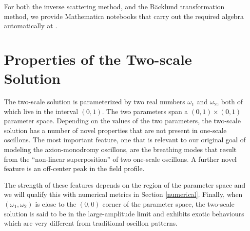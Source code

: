 \documentclass[11pt]{book}
\begin{document}
\medbreak
For both the inverse scattering method, and the B\"acklund transformation method, we provide Mathematica notebooks that carry out the required algebra automatically at \cite{mathematica}.

\chapter{Properties of the Two-scale Solution}\label{prop}
The two-scale solution is parameterized by two real numbers $\omega_1$ and $\omega_2$, both of which live in the interval $(0,1)$. The two parameters span a $(0,1)\times(0,1)$ parameter space. Depending on the values of the two parameters, the two-scale solution has a number of novel properties that are not present in one-scale oscillons. The most important feature, one that is relevant to our original goal of modeling the axion-monodromy oscillons, are the breathing modes that result from the ``non-linear superposition'' of two one-scale oscillons. A further novel feature is an off-center peak in the field profile.

The strength of these features depends on the region of the parameter space and we will qualify this with numerical metrics in Section \ref{numerical}. Finally, when $(\omega_1,\omega_2)$ is close to the $(0,0)$ corner of the parameter space, the two-scale solution is said to be in the large-amplitude limit and exhibits exotic behaviours which are very different from traditional oscillon patterns.
\end{document}
